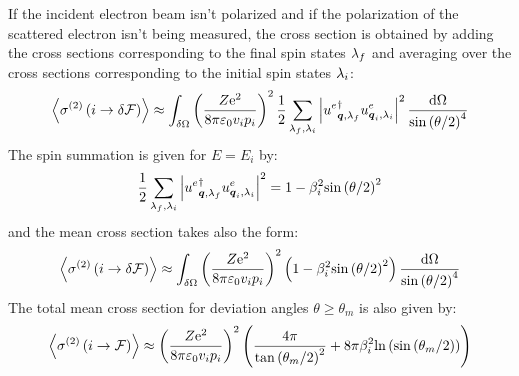 \documentclass[10pt,a4paper,twoside,openany]{book}
\begin{document}
If the incident electron beam isn't polarized and if the polarization of the scattered electron isn't being measured, the cross section is obtained by adding the cross sections corresponding to the final spin states $\sp_f$ and averaging over the cross sections corresponding to the initial spin states $\sp_i$:
\begin{equation*}
\left< \CSn i {\delta \F} 2 \right> \approx \int_{\delta \Omega} \left( \frac {Z \e^2} {8 \pi \vpty v_i p_i} \right)^2 \frac 1 2 \sum_{\sp_f,\sp_i} \left| \ddirspin \electron \q {\sp_f} \dirspin \electron {\q_i} {\sp_i} \right|^2 \frac {\dO} {\sin{\theta / 2}^4}
\end{equation*}
The spin summation is given for $E = E_i$ by:
\begin{equation*}
\frac 1 2 \sum_{\sp_f,\sp_i} \left| \ddirspin \electron \q {\sp_f} \dirspin \electron {\q_i} {\sp_i} \right|^2 = 1 - \beta_i^2 \sin{\theta / 2}^2
\end{equation*}
and the mean cross section takes also the form:
\begin{equation*}
\left< \CSn i {\delta \F} 2 \right> \approx \int_{\delta \Omega} \left( \frac {Z \e^2} {8 \pi \vpty v_i p_i} \right)^2 \left( 1 - \beta_i^2 \sin{\theta / 2}^2 \right) \frac {\dO} {\sin{\theta / 2}^4}
\end{equation*}
The total mean cross section for deviation angles $\theta \geq \theta_m$ is also given by:
\begin{equation*}
\left< \CSn i \F 2 \right> \approx \left( \frac {Z \e^2} {8 \pi \vpty v_i p_i} \right)^2 \left( \frac {4 \pi} {\tan{\theta_m / 2}^2} + 8 \pi \beta_i^2 \ln{\sin{\theta_m / 2}} \right)
\end{equation*}




\appendix
\end{document}
